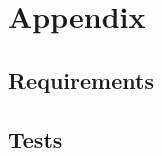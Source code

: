 \documentclass[11pt]{report}
\begin{document}



{}


\appendix

\chapter{Appendix}

 

\section{Requirements}

\section{Tests}

 
 
\end{document}
